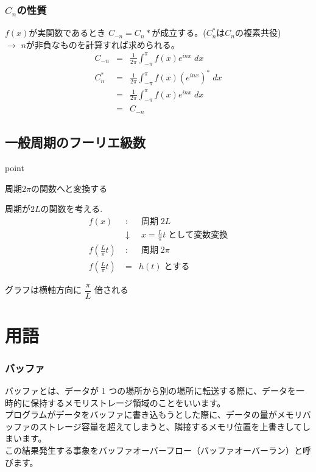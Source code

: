 \documentclass[a4paper]{jsarticle}
\begin{document}
\subsubsection*{$C_n$の性質}
$f\left(x\right)$が実関数であるとき $C_{-n}=C_n*$が成立する。($C_n^*$は$C_n$の複素共役)\\
$\rightarrow$ $n$が非負なものを計算すれば求められる。
\begin{eqnarray*}
    C_{-n} &=& \frac{1}{2\pi} \int^{\pi}_{-\pi} f\left(x\right) e^{inx} \;dx\\
    C_{n}^* &=& \frac{1}{2\pi} \int^{\pi}_{-\pi} f\left(x\right) \left(e^{inx}\right)^* \;dx\\
    &=& \frac{1}{2\pi} \int^{\pi}_{-\pi} f\left(x\right) e^{inx} \;dx\\
    &=& C_{-n}
\end{eqnarray*}

\subsection{一般周期のフーリエ級数}
\begin{itembox}[l]{point}
    \begin{center}
        周期$2\pi$の関数へと変換する
    \end{center}
\end{itembox}
周期が$2L$の関数を考える.\\
\begin{eqnarray*}
    f\left(x\right) \;&:&\; 周期 \; 2L\\
    &\downarrow& \; x = \frac{L}{\pi} t \; として変数変換\\
    f\left(\frac{L}{\pi} t\right) \;&:&\; 周期 \; 2\pi\\
    f\left(\frac{L}{\pi} t\right) &=& h\left(t\right) \; とする
\end{eqnarray*}
\begin{center}
    グラフは横軸方向に $\dfrac{\pi}{L}$ 倍される
\end{center}
\section{用語}
\subsubsection*{バッファ}
バッファとは、データが 1 つの場所から別の場所に転送する際に、データを一時的に保持するメモリストレージ領域のことをいいます。\\
プログラムがデータをバッファに書き込もうとした際に、データの量がメモリバッファのストレージ容量を超えてしまうと、隣接するメモリ位置を上書きしてしまいます。\\
この結果発生する事象をバッファオーバーフロー（バッファオーバーラン）と呼びます。\\
\end{document}
